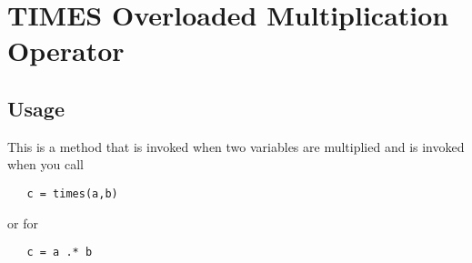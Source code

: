 \section{TIMES Overloaded Multiplication Operator}

\subsection{Usage}

This is a method that is invoked when two variables are multiplied
and is invoked when you call
\begin{verbatim}
   c = times(a,b)
\end{verbatim}
or for
\begin{verbatim}
   c = a .* b
\end{verbatim}

